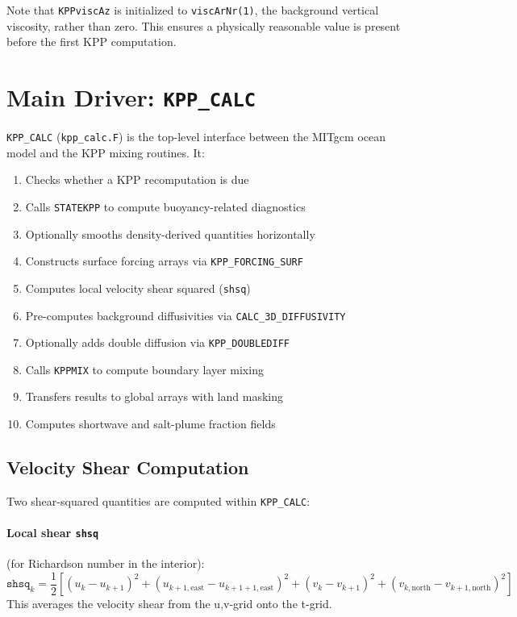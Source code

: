 \documentclass[12pt,letterpaper]{article}
\begin{document}
Note that \texttt{KPPviscAz} is initialized to \texttt{viscArNr(1)},  
the background vertical viscosity, rather than zero. This ensures a  
physically reasonable value is present before the first KPP computation.  
  
\section{Main Driver: \texttt{KPP\_CALC}}  
  
\texttt{KPP\_CALC} (\texttt{kpp\_calc.F}) is the top-level interface  
between the MITgcm ocean model and the KPP mixing routines. It:  
  
\begin{enumerate}[leftmargin=*, label=\textbf{\arabic*.}]  
  \item Checks whether a KPP recomputation is due  
  \item Calls \texttt{STATEKPP} to compute buoyancy-related diagnostics  
  \item Optionally smooths density-derived quantities horizontally  
  \item Constructs surface forcing arrays via \texttt{KPP\_FORCING\_SURF}  
  \item Computes local velocity shear squared (\texttt{shsq})  
  \item Pre-computes background diffusivities via \texttt{CALC\_3D\_DIFFUSIVITY}  
  \item Optionally adds double diffusion via \texttt{KPP\_DOUBLEDIFF}  
  \item Calls \texttt{KPPMIX} to compute boundary layer mixing  
  \item Transfers results to global arrays with land masking  
  \item Computes shortwave and salt-plume fraction fields  
\end{enumerate}  
  
\subsection{Velocity Shear Computation}  
  
Two shear-squared quantities are computed within \texttt{KPP\_CALC}:  
  
\paragraph{Local shear \texttt{shsq}} (for Richardson number in the interior):  
\begin{equation}  
\texttt{shsq}_{k} = \frac{1}{2}\left[  
  (u_k - u_{k+1})^2 + (u_{k+1, \text{east}} - u_{k+1+1, \text{east}})^2 +  
  (v_k - v_{k+1})^2 + (v_{k, \text{north}} - v_{k+1, \text{north}})^2  
\right]  
\end{equation}  
This averages the velocity shear from the u,v-grid onto the t-grid.  
  
\end{document}
